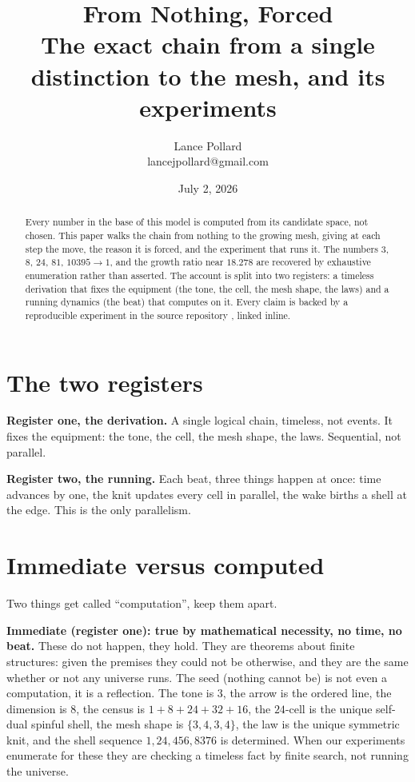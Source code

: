 \documentclass{article}
\title{\textbf{\huge From Nothing, Forced}\\[3mm]
  \large The exact chain from a single distinction to the mesh, and its experiments}
\author{Lance Pollard \\ \small lancejpollard@gmail.com}
\date{July 2, 2026}
\begin{document}
\maketitle
\thispagestyle{empty}

\begin{abstract}
Every number in the base of this model is computed from its candidate space, not chosen. This
paper walks the chain from nothing to the growing mesh, giving at each step the move, the
reason it is forced, and the experiment that runs it. The numbers $3$, $8$, $24$, $81$,
$10395 \to 1$, and the growth ratio near $18.278$ are recovered by exhaustive enumeration
rather than asserted. The account is split into two registers: a timeless derivation that
fixes the equipment (the tone, the cell, the mesh shape, the laws) and a running dynamics
(the beat) that computes on it. Every claim is backed by a reproducible experiment in the
source repository \cite{cluesurf2026repo}, linked inline.
\end{abstract}

\section{The two registers}

\textbf{Register one, the derivation.} A single logical chain, timeless, not events. It fixes
the equipment: the tone, the cell, the mesh shape, the laws. Sequential, not parallel.

\textbf{Register two, the running.} Each beat, three things happen at once: time advances by
one, the knit updates every cell in parallel, the wake births a shell at the edge. This is the
only parallelism.

\section{Immediate versus computed}

Two things get called ``computation'', keep them apart.

\textbf{Immediate (register one): true by mathematical necessity, no time, no beat.} These do
not happen, they hold. They are theorems about finite structures: given the premises they could
not be otherwise, and they are the same whether or not any universe runs. The seed (nothing
cannot be) is not even a computation, it is a reflection. The tone is $3$, the arrow is the
ordered line, the dimension is $8$, the census is $1{+}8{+}24{+}32{+}16$, the $24$-cell is the
unique self-dual spinful shell, the mesh shape is $\{3,4,3,4\}$, the law is the unique symmetric
knit, and the shell sequence $1, 24, 456, 8376$ is determined. When our experiments enumerate
for these they are checking a timeless fact by finite search, not running the universe.
\end{document}
